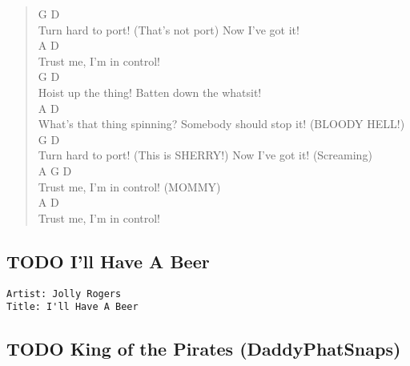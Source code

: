 \documentclass[11pt]{article}
\begin{document}
\begin{verse}
G                                    D\\
Turn hard to port! (That's not port) Now I've got it!\\
A                   D\\
Trust me, I'm in control!\\
\vspace*{1em}
G                   D\\
Hoist up the thing! Batten down the whatsit!\\
A                               D\\
What's that thing spinning? Somebody should stop it! (BLOODY HELL!)\\
G                                    D\\
Turn hard to port! (This is SHERRY!) Now I've got it! (Screaming)\\
A             G     D\\
Trust me, I'm in control! (MOMMY)\\
A                   D\\
Trust me, I'm in control!\\
\end{verse}
\clearpage
\subsection{{\bfseries\sffamily TODO} I'll Have A Beer}
\label{sec:org7120496}
\begin{verbatim}
Artist: Jolly Rogers
Title: I'll Have A Beer
\end{verbatim}
\clearpage
\subsection{{\bfseries\sffamily TODO} King of the Pirates (DaddyPhatSnaps)}
\label{sec:org6bf81f7}
\clearpage
\end{document}
